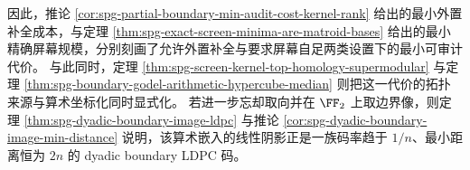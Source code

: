因此，推论 \ref{cor:spg-partial-boundary-min-audit-cost-kernel-rank} 给出的最小外置补全成本，与定理 \ref{thm:spg-exact-screen-minima-are-matroid-bases} 给出的最小精确屏幕规模，分别刻画了允许外置补全与要求屏幕自足两类设置下的最小可审计代价。
与此同时，定理 \ref{thm:spg-screen-kernel-top-homology-supermodular} 与定理 \ref{thm:spg-boundary-godel-arithmetic-hypercube-median} 则把这一代价的拓扑来源与算术坐标化同时显式化。
若进一步忘却取向并在 \(\FF_2\) 上取边界像，则定理 \ref{thm:spg-dyadic-boundary-image-ldpc} 与推论 \ref{cor:spg-dyadic-boundary-image-min-distance} 说明，该算术嵌入的线性阴影正是一族码率趋于 \(1/n\)、最小距离恒为 \(2n\) 的 dyadic boundary LDPC 码。

\endinput
